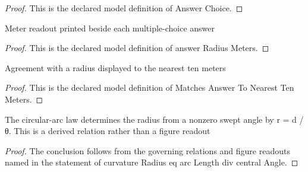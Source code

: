 \begin{proof}
  This is the declared model definition of Answer Choice.
\end{proof}
\begin{definition}
  \label{def:physics:phyx-mini-0667:phyxminiproblems-problemphyxmini0667-answerradiusmeters}
  Meter readout printed beside each multiple-choice answer
\end{definition}
\begin{proof}
  This is the declared model definition of answer Radius Meters.
\end{proof}
\begin{definition}
  \label{def:physics:phyx-mini-0667:phyxminiproblems-problemphyxmini0667-matchesanswertonearesttenmeters}
  Agreement with a radius displayed to the nearest ten meters
\end{definition}
\begin{proof}
  This is the declared model definition of Matches Answer To Nearest Ten Meters.
\end{proof}
\begin{lemma}
  \label{lem:physics:phyx-mini-0667:phyxminiproblems-problemphyxmini0667-curvatureradius-eq-arclength-div-centralangle}
  The circular-arc law determines the radius from a nonzero swept angle by r = d / θ. This is a derived relation rather than a figure readout
\end{lemma}
\begin{proof}
  The conclusion follows from the governing relations and figure readouts named in the statement of curvature Radius eq arc Length div central Angle.
\end{proof}
